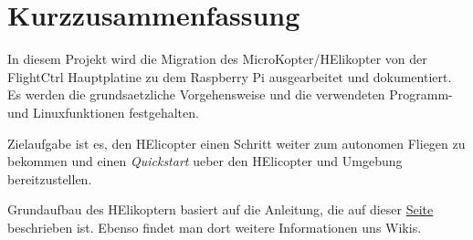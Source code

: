 \chapter*{Kurzzusammenfassung}

 
 In diesem Projekt wird die Migration des MicroKopter/HElikopter von der FlightCtrl Hauptplatine zu dem Raspberry Pi ausgearbeitet und dokumentiert. Es werden die grundsaetzliche Vorgehensweise und die verwendeten Programm- und Linuxfunktionen festgehalten. 
 
 Zielaufgabe ist es, den HElicopter einen Schritt weiter zum autonomen Fliegen zu bekommen und einen \textit{Quickstart} ueber den HElicopter und Umgebung bereitzustellen.
 
 Grundaufbau des HElikoptern basiert auf die Anleitung, die auf dieser  \href{http://www.mikrokopter.de/de/startseite}{Seite}  beschrieben ist. Ebenso findet man dort weitere Informationen uns Wikis.
